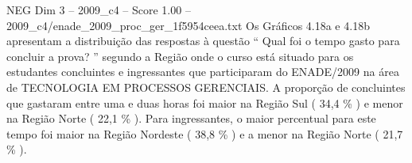 \begin{textsample}{NEG Dim 3 – 2009\_c4 – Score 1.00 – 2009\_c4/enade\_2009\_proc\_ger\_1f5954ceea.txt}
Os Gráficos 4.18a e 4.18b apresentam a distribuição das respostas à questão “ Qual foi o tempo gasto para concluir a prova? ” segundo a Região onde o curso está situado para os estudantes concluintes e ingressantes que participaram do ENADE/2009 na área de TECNOLOGIA EM PROCESSOS GERENCIAIS.
A proporção de concluintes que gastaram entre uma e duas horas foi maior na Região Sul ( 34,4 \% ) e menor na Região Norte ( 22,1 \% ).
Para ingressantes, o maior percentual para este tempo foi maior na Região Nordeste ( 38,8 \% ) e a menor na Região Norte ( 21,7 \% ).

\end{textsample}
